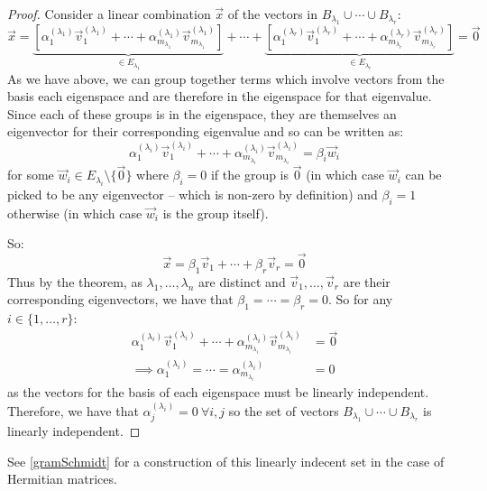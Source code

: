 \documentclass[../main.tex]{subfiles}
\begin{document}
\begin{proof}
  \nonexaminable
  Consider a linear combination $\vec{x}$ of the vectors in $B_{\lambda_1} \cup \cdots \cup B_{\lambda_r}$:
  \[
    \vec{x} = \underbrace{\left[\alpha^{(\lambda_1)}_1 \vec{v}^{(\lambda_1)}_1 + \cdots + \alpha^{(\lambda_1)}_{m_{\lambda_1}} \vec{v}^{(\lambda_1)}_{m_{\lambda_1}}\right]}_{\in E_{\lambda_1}}
    + \cdots +
    \underbrace{\left[\alpha^{(\lambda_r)}_1 \vec{v}^{(\lambda_r)}_1 + \cdots + \alpha^{(\lambda_r)}_{m_{\lambda_r}} \vec{v}^{(\lambda_r)}_{m_{\lambda_r}}\right]}_{\in E_{\lambda_r}} = \vec{0}
  \]
  As we have above, we can group together terms which involve vectors from the basis each eigenspace and are therefore in the eigenspace for that eigenvalue.
  Since each of these groups is in the eigenspace, they are themselves an eigenvector for their corresponding eigenvalue and so can be written as:
  \[
    \alpha^{(\lambda_i)}_1 \vec{v}^{(\lambda_i)}_1 + \cdots + \alpha^{(\lambda_i)}_{m_{\lambda_i}} \vec{v}^{(\lambda_i)}_{m_{\lambda_i}} = \beta_i \vec{w}_i
  \]
  for some $\vec{w}_i \in E_{\lambda_i} \setminus \{\vec{0}\}$ where $\beta_i = 0$ if the group is $\vec{0}$ (in which case $\vec{w}_i$ can be picked to be any eigenvector -- which is non-zero by definition) and $\beta_i = 1$ otherwise (in which case $\vec{w}_i$ is the group itself).

  So:
  \[
    \vec{x} = \beta_1 \vec{v}_1 + \cdots + \beta_r \vec{v}_r = \vec{0}
  \]
  Thus by the theorem, as $\lambda_1, \ldots, \lambda_n$ are distinct and $\vec{v}_1, \ldots, \vec{v}_r$ are their corresponding eigenvectors, we have that $\beta_1 = \cdots = \beta_r = 0$.
  So for any $i \in \{1, \ldots, r\}$:
  \begin{align*}
    \alpha^{(\lambda_i)}_1 \vec{v}^{(\lambda_i)}_1 + \cdots + \alpha^{(\lambda_i)}_{m_{\lambda_i}} \vec{v}^{(\lambda_i)}_{m_{\lambda_i}} &= \vec{0} \\
    \implies \alpha^{(\lambda_i)}_1 = \cdots = \alpha^{(\lambda_i)}_{m_{\lambda_i}} &= 0
  \end{align*}
  as the vectors for the basis of each eigenspace must be linearly independent.
  Therefore, we have that $\alpha^{(\lambda_i)}_j = 0\ \forall i, j$ so the set of vectors $B_{\lambda_1} \cup \cdots \cup B_{\lambda_r}$ is linearly independent.
\end{proof}
\begin{remark}
  See \cref{gramSchmidt} for a construction of this linearly indecent set in the case of Hermitian matrices.
\end{remark}
\end{document}
